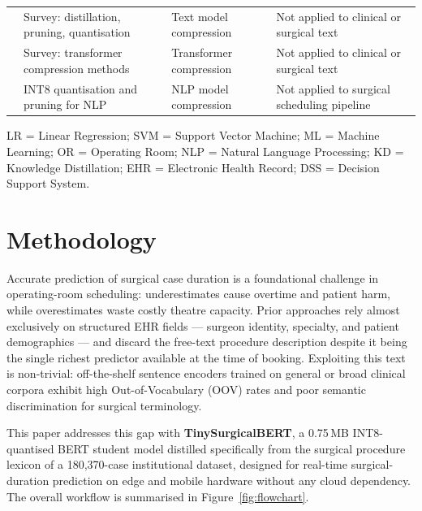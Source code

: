 \documentclass[3p]{elsarticle}
\begin{document}
\begin{table}[ht]
\begin{threeparttable}
\begin{tabularx}{\linewidth}{@{}lXlX@{}}
\cite{gupta2022compression}  & Survey: distillation, pruning, quantisation & Text model compression & Not applied to clinical or surgical text \\
\cite{tang2024survey}        & Survey: transformer compression methods & Transformer compression & Not applied to clinical or surgical text \\
\cite{bibi2024advances}      & INT8 quantisation and pruning for NLP & NLP model compression & Not applied to surgical scheduling pipeline \\
\bottomrule
\end{tabularx}
\begin{tablenotes}
\small
\item LR = Linear Regression; SVM = Support Vector Machine; ML = Machine Learning; OR = Operating Room; NLP = Natural Language Processing; KD = Knowledge Distillation; EHR = Electronic Health Record; DSS = Decision Support System.
\end{tablenotes}
\end{threeparttable}
\end{table}


\section{Methodology}\label{sec:methodology}

Accurate prediction of surgical case duration is a foundational challenge in operating-room scheduling: underestimates cause overtime and patient harm, while overestimates waste costly theatre capacity. Prior approaches rely almost exclusively on structured EHR fields — surgeon identity, specialty, and patient demographics — and discard the free-text procedure description despite it being the single richest predictor available at the time of booking. Exploiting this text is non-trivial: off-the-shelf sentence encoders trained on general or broad clinical corpora exhibit high Out-of-Vocabulary (OOV) rates and poor semantic discrimination for surgical terminology.

This paper addresses this gap with \textbf{TinySurgicalBERT}, a 0.75\,MB INT8-quantised BERT student model distilled specifically from the surgical procedure lexicon of a 180,370-case institutional dataset, designed for real-time surgical-duration prediction on edge and mobile hardware without any cloud dependency. The overall workflow is summarised in Figure~\ref{fig:flowchart}.
\end{document}
